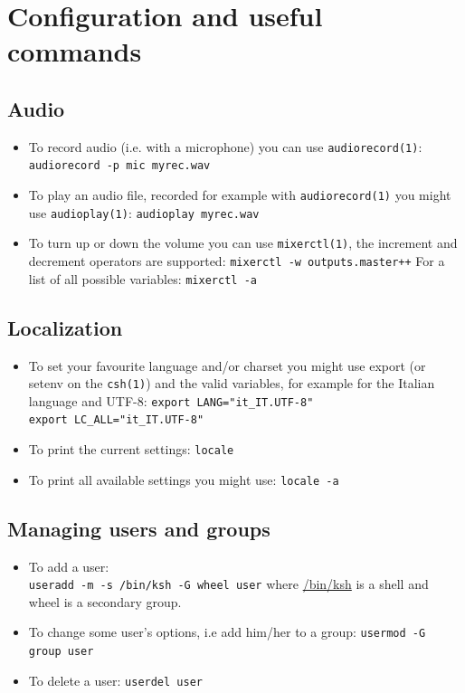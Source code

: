 \documentclass[notumble]{leaflet}
\newcommand{\man}[1]{\mbox{\texttt{#1}}}
\begin{document}
\section{Configuration and useful commands}
\subsection{Audio}
\begin{itemize}
\item To record audio (i.e. with a microphone) you can use
\man{audiorecord(1)}: \verb|audiorecord -p mic myrec.wav|
\item To play an audio file, recorded for example with
\man{audiorecord(1)} you might use \man{audioplay(1)}:
\verb|audioplay myrec.wav|
\item To turn up or down the volume you can use \man{mixerctl(1)},
the increment and decrement operators are supported:
\verb|mixerctl -w outputs.master++|
For a list of all possible variables:
\verb|mixerctl -a|
\end{itemize}

\subsection{Localization}
\begin{itemize}
\item To set your favourite language and/or charset you might use \mbox{export}
(or \mbox{setenv} on the \man{csh(1)}) and the valid variables, for example for
the Italian language and \mbox{UTF-8}:
\verb|export LANG="it_IT.UTF-8"| \\
\verb|export LC_ALL="it_IT.UTF-8"|
\item To print the current settings:
\verb|locale|
\item To print all available settings you might use:
\verb|locale -a|
\end{itemize}

\subsection{Managing users and groups}
\begin{itemize}
\item To add a user: \\
\verb|useradd -m -s /bin/ksh -G wheel user|
where \url{/bin/ksh} is a shell and \mbox{wheel} is a secondary group.
\item To change some user's options, i.e add him/her to a group:
\verb|usermod -G group user|
\item To delete a user: \verb|userdel user|
\end{itemize}
\end{document}

